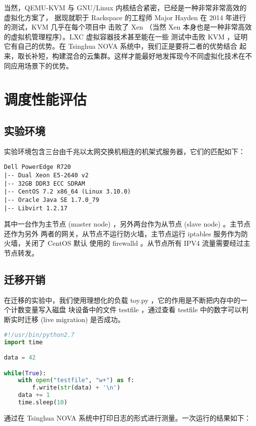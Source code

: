 当然，QEMU-KVM 与 GNU/Linux 内核结合紧密，已经是一种非常非常高效的虚拟化方案了，
据现就职于 Rackspace 的工程师 Major Hayden 在 2014 年进行的测试，KVM 几乎在每个项目中
击败了 Xen （当然 Xen 本身也是一种非常高效的虚拟机管理程序）。LXC 虚拟容器技术甚至能在一些
测试中击败 KVM ，证明它有自己的优势。在 Tsinghua NOVA 系统中，我们正是要将二者的优势结合
起来，取长补短，构建混合的云集群。这样才能最好地发挥现今不同虚拟化技术在不同应用场景下的优势。

\section{调度性能评估}

\subsection{实验环境}

实验环境包含三台由千兆以太网交换机相连的机架式服务器，它们的匹配如下：

\begin{lstlisting}
Dell PowerEdge R720
|-- Dual Xeon E5-2640 v2
|-- 32GB DDR3 ECC SDRAM
|-- CentOS 7.2 x86_64 (Linux 3.10.0)
|-- Oracle Java SE 1.7.0_79
|-- Libvirt 1.2.17
\end{lstlisting}

其中一台作为主节点 (master node) ，另外两台作为从节点 (slave node) 。主节点还作为另外
两者的网关，从节点不运行防火墙，主节点运行 iptables 服务作为防火墙，关闭了 CentOS 默认
使用的 firewalld 。从节点所有 IPV4 流量需要经过主节点转发。

\subsection{迁移开销}

在迁移的实验中，我们使用理想化的负载 toy.py ，它的作用是不断把内存中的一个计数变量写入磁盘
块设备中的文件 testfile ，通过查看 testfile 中的数字可以判断实时迁移 (live migration)
是否成功。

\begin{lstlisting}[language=Python]
#!/usr/bin/python2.7
import time

data = 42

while(True):
    with open("testfile", "w+") as f:
        f.write(str(data) + '\n')
    data += 1
    time.sleep(10)
\end{lstlisting}

通过在 Tsinghua NOVA 系统中打印日志的形式进行测量。一次运行的结果如下：

